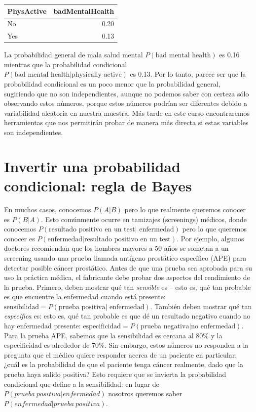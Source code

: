 \documentclass[
  12pt,
]{book}
\begin{document}
\begin{tabular}{l|r}
\hline
PhysActive & badMentalHealth\\
\hline
No & 0.20\\
\hline
Yes & 0.13\\
\hline
\end{tabular}

La probabilidad general de mala salud mental \(P(\text{bad mental health})\) es 0.16 mientras que la probabilidad condicional \(P(\text{bad mental health|physically active})\) es 0.13. Por lo tanto, parece ser que la probabilidad condicional es un poco menor que la probabilidad general, sugiriendo que no son independientes, aunque no podemos saber con certeza sólo observando estos números, porque estos números podrían ser diferentes debido a variabilidad aleatoria en nuestra muestra. Más tarde en este curso encontraremos herramientas que nos permitirán probar de manera más directa si estas variables son independientes.

\hypertarget{bayestheorem}{%
\section{Invertir una probabilidad condicional: regla de Bayes}\label{bayestheorem}}

En muchos casos, conocemos \(P(A|B)\) pero lo que realmente queremos conocer es \(P(B|A)\). Esto comúnmente ocurre en tamizajes (screenings) médicos, donde conocemos \(P(\text{resultado positivo en un test| enfermedad})\) pero lo que queremos conocer es \(P(\text{enfermedad|resultado positivo en un test})\). Por ejemplo, algunos doctores recomiendan que los hombres mayores a 50 años se sometan a un screening usando una prueba llamada antígeno prostático específico (APE) para detectar posible cáncer prostático. Antes de que una prueba sea aprobada para su uso la práctica médica, el fabricante debe probar dos aspectos del rendimiento de la prueba. Primero, deben mostrar qué tan \emph{sensible} es -- esto es, qué tan probable es que encuentre la enfermedad cuando está presente: \(\text{sensibilidad} = P(\text{prueba positiva| enfermedad})\). También deben mostrar qué tan \emph{específica} es: esto es, qué tan probable es que dé un resultado negativo cuando no hay enfermedad presente: \(\text{especificidad} = P(\text{prueba negativa|no enfermedad})\). Para la prueba APE, sabemos que la sensibilidad es cercana al 80\% y la especificidad es alrededor de 70\%. Sin embargo, estos números no responden a la pregunta que el médico quiere responder acerca de un paciente en particular: ¿cuál es la probabilidad de que el paciente tenga cáncer realmente, dado que la prueba haya salido positiva? Esto requiere que se invierta la probabilidad condicional que define a la sensibilidad: en lugar de \(P(prueba\ positiva| enfermedad)\) nosotros queremos saber \(P(enfermedad|prueba\ positiva)\).
\end{document}
